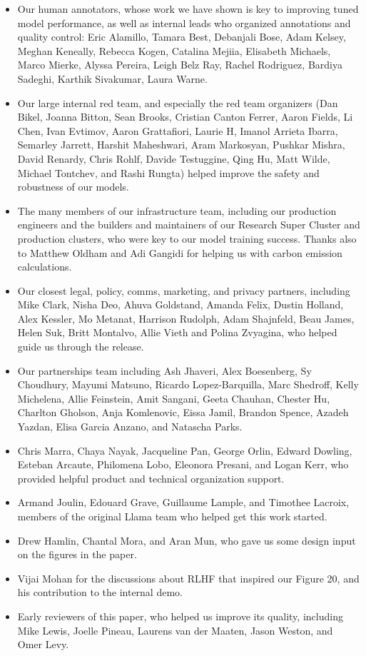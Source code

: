\begin{itemize}
    \item Our human annotators, whose work we have shown is key to improving tuned model performance, as well as internal leads who organized annotations and quality control: Eric Alamillo, Tamara Best, Debanjali Bose, Adam Kelsey, Meghan Keneally, Rebecca Kogen, Catalina Mejiia, Elisabeth Michaels, Marco Mierke, Alyssa Pereira, Leigh Belz Ray, Rachel Rodriguez, Bardiya Sadeghi, Karthik Sivakumar, Laura Warne.
    \item Our large internal red team, and especially the red team organizers (Dan Bikel, Joanna Bitton, Sean Brooks, Cristian Canton Ferrer, Aaron Fields, Li Chen, Ivan Evtimov, Aaron Grattafiori, Laurie H, Imanol Arrieta Ibarra, Semarley Jarrett, Harshit Maheshwari, Aram Markosyan, Pushkar Mishra, David Renardy, Chris Rohlf, Davide Testuggine, Qing Hu, Matt Wilde, Michael Tontchev, and Rashi Rungta) helped improve the safety and robustness of our models.
    \item The many members of our infrastructure team, including our production engineers and the builders and maintainers of our Research Super Cluster and production clusters, who were key to our model training success. Thanks also to Matthew Oldham and Adi Gangidi for helping us with carbon emission calculations.
    \item Our closest legal, policy, comms, marketing, and privacy partners, including Mike Clark, Nisha Deo, Ahuva Goldstand, Amanda Felix, Dustin Holland, Alex Kessler, Mo Metanat, Harrison Rudolph, Adam Shajnfeld, Beau James, Helen Suk, Britt Montalvo, Allie Vieth and Polina Zvyagina, who helped guide us through the release.
    \item Our partnerships team including Ash Jhaveri, Alex Boesenberg, Sy Choudhury, Mayumi Matsuno, Ricardo Lopez-Barquilla, Marc Shedroff, Kelly Michelena, Allie Feinstein, Amit Sangani, Geeta Chauhan, Chester Hu, Charlton Gholson, Anja Komlenovic, Eissa Jamil, Brandon Spence, Azadeh Yazdan, Elisa Garcia Anzano, and Natascha Parks.  
    \item Chris Marra, Chaya Nayak, Jacqueline Pan, George Orlin, Edward Dowling, Esteban Arcaute, Philomena Lobo, Eleonora Presani, and Logan Kerr, who provided helpful product and technical organization support.
    \item Armand Joulin, Edouard Grave, Guillaume Lample, and Timothee Lacroix, members of the original Llama team who helped get this work started.
    \item Drew Hamlin, Chantal Mora, and Aran Mun, who gave us some design input on the figures in the paper.
    \item Vijai Mohan for the discussions about RLHF that inspired our Figure 20, and his contribution to the internal demo.
    \item Early reviewers of this paper, who helped us improve its quality, including Mike Lewis, Joelle Pineau, Laurens van der Maaten, Jason Weston, and Omer Levy.
\end{itemize}



